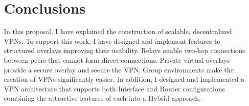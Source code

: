\chapter{Conclusions}
In this proposal, I have explained the construction of scalable, decentralized
VPNs.  To support this work, I have designed and implement features to
structured overlays improving their usability.  Relays enable two-hop
connections between peers that cannot form direct connections.  Private
virtual overlays provide a secure overlay and secure the VPN.  Group
environments make the creation of VPNs significantly easier.  In addition, I
designed and implemented a VPN architecture that supports both Interface and
Router configurations combining the attractive features of each into a Hybrid
approach.
